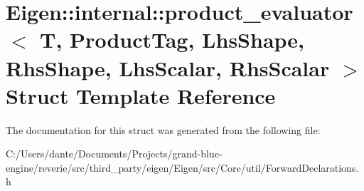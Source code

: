 \hypertarget{struct_eigen_1_1internal_1_1product__evaluator}{}\section{Eigen\+::internal\+::product\+\_\+evaluator$<$ T, Product\+Tag, Lhs\+Shape, Rhs\+Shape, Lhs\+Scalar, Rhs\+Scalar $>$ Struct Template Reference}
\label{struct_eigen_1_1internal_1_1product__evaluator}


The documentation for this struct was generated from the following file\+:\begin{DoxyCompactItemize}
\item 
C\+:/\+Users/dante/\+Documents/\+Projects/grand-\/blue-\/engine/reverie/src/third\+\_\+party/eigen/\+Eigen/src/\+Core/util/Forward\+Declarations.\+h\end{DoxyCompactItemize}
